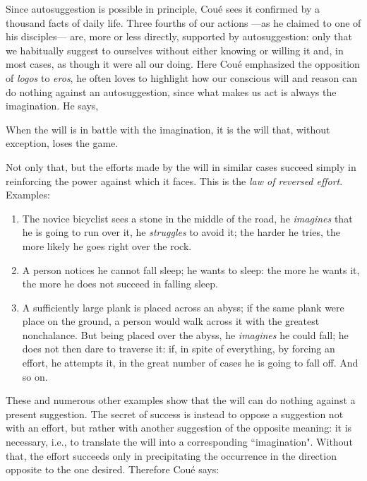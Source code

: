 Since autosuggestion is possible in principle, Coué sees it confirmed by a thousand facts of daily life. Three fourths of our actions —as he claimed to one of his disciples— are, more or less directly, supported by autosuggestion: only that we habitually suggest to ourselves without either knowing or willing it and, in most cases, as though it were all our doing. Here Coué emphasized the opposition of \textit{logos} to \textit{eros}, he often loves to highlight how our conscious will and reason can do nothing against an autosuggestion, since what makes us act is always the imagination. He says,

\begin{quotex}
When the will is in battle with the imagination, it is the will that, without exception, loses the game. 
\end{quotex}

Not only that, but the efforts made by the will in similar cases succeed simply in reinforcing the power against which it faces. This is the \textit{law of reversed effort}. Examples:

\begin{enumerate}
\item The novice bicyclist sees a stone in the middle of the road, he \textit{imagines} that he is going to run over it, he \textit{struggles} to avoid it; the harder he tries, the more likely he goes right over the rock. 
\item A person notices he cannot fall sleep; he wants to sleep: the more he wants it, the more he does not succeed in falling sleep. 
\item A sufficiently large plank is placed across an abyss; if the same plank were place on the ground, a person would walk across it with the greatest nonchalance. But being placed over the abyss, he \textit{imagines} he could fall; he does not then dare to traverse it: if, in spite of everything, by forcing an effort, he attempts it, in the great number of cases he is going to fall off. And so on. 
\end{enumerate}
These and numerous other examples show that the will can do nothing against a present suggestion. The secret of success is instead to oppose a suggestion not with an effort, but rather with another suggestion of the opposite meaning: it is necessary, i.e., to translate the will into a corresponding ``imagination". Without that, the effort succeeds only in precipitating the occurrence in the direction opposite to the one desired. Therefore Coué says:

